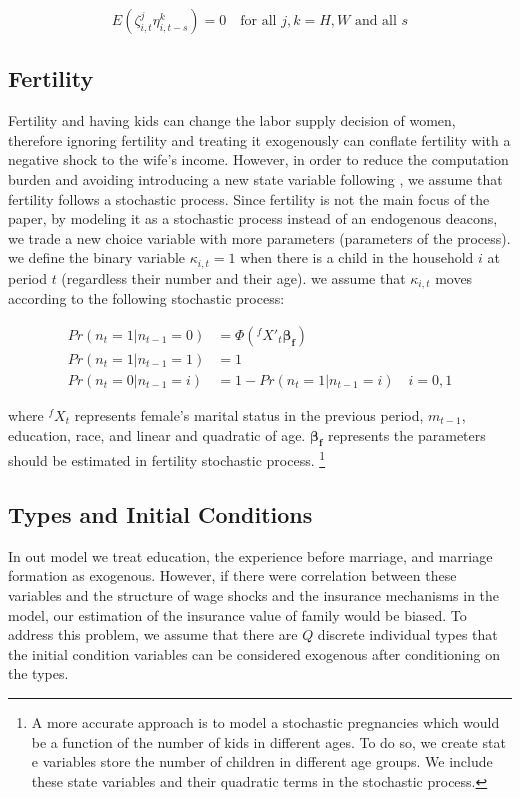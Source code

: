 \begin{equation*}
E(\zeta^j_{i,t} \eta^k_{i,t-s}) = 0 \quad \text{for all $j,k = {H, W}$ and all $s$}
\end{equation*}

\subsection{Fertility}

Fertility and having kids can change the labor supply decision of women, therefore ignoring fertility and treating it exogenously can conflate fertility with a negative shock to the wife's income. However, in order to reduce the computation burden and avoiding introducing a new state variable following \citet{Klaau_1996}, we assume that fertility follows a stochastic process. Since fertility is not the main focus of the paper, by modeling it as a stochastic process  instead of an endogenous deacons, we trade a new choice variable with more parameters (parameters of the process). we define the binary variable $\kappa_{i,t} =1$ when there is a child in the household $i$ at period $t$ (regardless their number and their age). we assume that $\kappa_{i,t}$ moves according to the following stochastic process: 

\begin{align*}
Pr(n_t =1 | n_{t-1} =0) &= \Phi(^fX'_t \mathbf{\beta_f}) \\
Pr(n_t = 1 | n_{t-1} =1) &= 1 \\
Pr(n_t = 0 | n_{t-1} = i ) &= 1 - Pr(n_t =1 | n_{t-1} = i) \quad i = 0,1
\end{align*}

\noindent where $^fX_t$ represents female's marital status in the previous period, $m_{t-1}$, education, race, and linear and quadratic of age. $\mathbf {\beta_f}$ represents the parameters should be estimated in fertility stochastic process. 
\footnote{A more accurate approach is to model a stochastic pregnancies which would be a function of the number of kids in different ages. To do so, we create stat e variables store the number of children in different age groups. We include these state variables  and their quadratic terms in the stochastic process. }


\subsection{Types and Initial Conditions}

In out model we treat education, the experience before marriage, and marriage formation as exogenous. However, if there were correlation between these variables and the structure of wage shocks and the insurance mechanisms in the model, our estimation of the insurance value of family would be biased. To address this problem, we assume that there are $Q$ discrete individual types that the initial condition variables can be considered exogenous after conditioning on the types. \\

